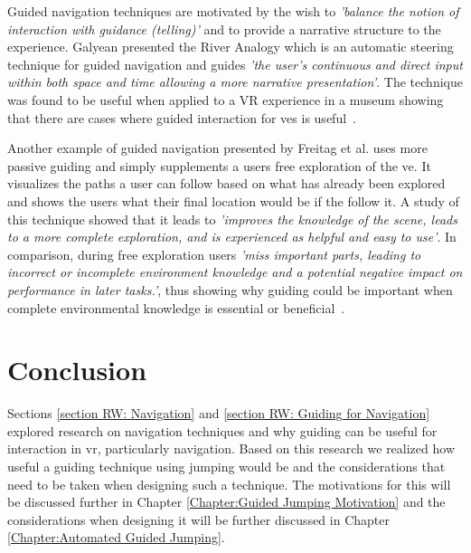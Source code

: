 Guided navigation techniques are motivated by the wish to \textit{'balance the notion of interaction with guidance (telling)'} and to provide a narrative structure to the experience. Galyean presented the River Analogy which is an automatic steering technique for guided navigation and guides \textit{'the user’s continuous and direct input within both space and time allowing a more narrative presentation'}. The technique was found to be useful when applied to a VR experience in a museum showing that there are cases where guided interaction for \acrshort{ve}s is useful~\cite{Galyean1995}.

Another example of guided navigation presented by Freitag et al. uses more passive guiding and simply supplements a users free exploration of the \acrshort{ve}. It visualizes the paths a user can follow based on what has already been explored and shows the users what their final location would be if the follow it. A study of this technique showed that it leads to \textit{'improves the knowledge of the scene, leads to a more complete exploration, and is experienced as helpful and easy to use'}. In comparison, during free exploration users \textit{'miss important parts, leading to incorrect or incomplete environment knowledge and a potential negative impact on performance in later tasks.'}, thus showing why guiding could be important when complete environmental knowledge is essential or beneficial~\cite{Freitag2018}.

\section{Conclusion}
\label{section RW: Conclusion}
Sections \ref{section RW: Navigation} and \ref{section RW: Guiding for Navigation} explored research on navigation techniques and why guiding can be useful for interaction in \acrshort{vr}, particularly navigation. Based on this research we realized how useful a guiding technique using jumping would be and the considerations that need to be taken when designing such a technique. The motivations for this will be discussed further in Chapter \ref{Chapter:Guided Jumping Motivation} and the considerations when designing it will be further discussed in Chapter \ref{Chapter:Automated Guided Jumping}.
